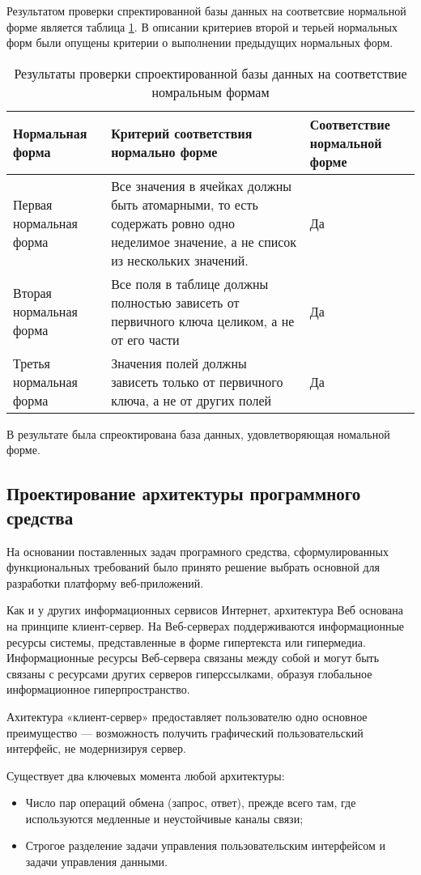 Результатом проверки спректированной базы данных на соответсвие нормальной форме является таблица \ref{db:normal}.
В описании критериев второй и терьей нормальных форм были опущены критерии о выполнении предыдущих нормальных форм.

\begin{longtable}{ | p{4cm} | p{6cm} | p{4cm} | }
    \caption{Результаты проверки спроектированной базы данных на соответствие номральным формам}
    \label{db:normal}
    \endfirsthead
    \endhead
    \hline
    Нормальная форма  & Критерий соответствия нормально форме & Соответствие нормальной форме \\ \hline
    Первая нормальная форма & Все значения в ячейках должны быть атомарными, то есть содержать ровно одно неделимое значение, а не список из нескольких значений. & Да  \\ \hline
    Вторая нормальная форма & Все поля в таблице должны полностью зависеть от первичного ключа целиком, а не от его части & Да  \\ \hline
    Третья нормальная форма & Значения полей должны зависеть только от первичного ключа, а не от других полей & Да  \\
    \hline
\end{longtable}

В результате была спреоктирована база данных, удовлетворяющая номальной форме.

\subsection{Проектирование архитектуры программного средства}
На основании поставленных задач програмного средства, сформулированных функциональных требований было принято решение выбрать основной для разработки платформу веб-приложений.

Как и у других информационных сервисов Интернет, архитектура Веб основана на принципе клиент-сервер.
На Веб-серверах поддерживаются информационные ресурсы системы, представленные в форме гипертекста или гипермедиа.
Информационные ресурсы Веб-сервера связаны между собой и могут быть связаны с ресурсами других серверов гиперссылками, образуя глобальное информационное гиперпространство.

Ахитектура «клиент-сервер» предоставляет пользователю одно основное преимущество — возможность получить графический пользовательский интерфейс, не модернизируя сервер.

Существует два ключевых момента любой архитектуры:
\begin{itemize}
    \item Число пар операций обмена (запрос, ответ), прежде всего там, где используются медленные и неустойчивые каналы связи;
    \item Строгое разделение задачи управления пользовательским интерфейсом и задачи управления данными.
\end{itemize}

